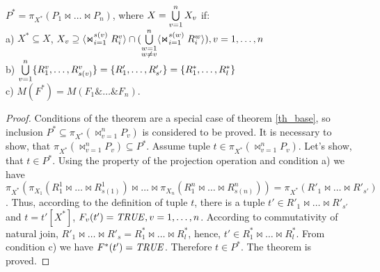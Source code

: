 \begin{theorem}
$P^{\ast} = \pi_{X^{\ast}} (P_1 \Join \dots \Join 
P_n)$, where $X = \bigcup\limits_{v=1}^{n} X_{v}$ if:
\\a) $X^{\ast} \subseteq X$, $X_v \supseteq \<\Join_{i=1}^{s(v)} R^v_i> \cap (\bigcup\limits_{\substack{w=1\\ w \neq v}}^{n} \<\Join_{i=1}^{s(w)} R^w_i> ), v = 1,\dots,n$
\\b)
$ \bigcup\limits_{v=1}^{n} \{R^{v}_{1}, \ldots, R^{v}_{s(v)}\} = \{R'_{1}, \ldots, R'_{s'}\}
= \{R^{\ast}_{1}, \ldots, R^{\ast}_{l}\} $
\\c) $M(F^{\ast}) = M(F_{1} \& \dots \& F_{n})$.
\label{th_mult_eq}
\end{theorem} 
\begin{proof}
Conditions of the theorem are a special case of theorem \ref{th_base}, so
inclusion  $P^{\ast} \subseteq \pi_{X^{\ast}} (\Join_{v=1}^{n} P_{v})$ is
considered to be proved. It is necessary to show, that $\pi_{X^{\ast}}
(\Join_{v=1}^{n} P_{v}) \subseteq P^{\ast}$. Assume tuple $t \in \pi_{X^{\ast}}
(\Join_{v=1}^{n} P_{v})$. Let's show, that $t \in P^{\ast}$. Using the property
of the projection operation and condition a) we have $\pi_{X^{\ast}}(\pi_{X_1}
(R^1_1 \Join \dots \Join R^1_{s(1)}) \Join \dots \Join \pi_{X_n}(R^n_1 \Join
\dots \Join R^n_{s(n)})) = \pi_{X^{\ast}} (R'_1 \Join \dots \Join R'_{s'})$.
Thus, according to the definition of tuple $t$, there is a tuple  $t' \in R'_1
\Join \ldots \Join R'_{s'}$ and $t = t'[X^{\ast}]$, $F_v(t')=\mathit{TRUE}, v =
1,\dots,n$. According to commutativity of natural join, $R'_1 \Join \ldots \Join
R'_s = R^{\ast}_1 \Join \ldots \Join R^{\ast}_l$, hence, $t' \in R^{\ast}_1 \Join
\ldots \Join R^{\ast}_l$. From condition c) we have $F^{\ast} (t')=\mathit{TRUE}$. Therefore $t \in P^{\ast}$. The theorem is proved.
\end{proof} 

